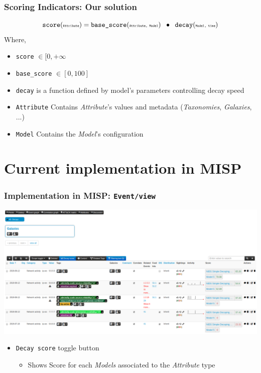 \begin{frame}
    \frametitle{Scoring Indicators: Our solution}
    $$ \texttt{score}(\texttt{\tiny Attribute}) = \texttt{base\_score}(\texttt{\tiny Attribute, Model}) \;\;\bullet\;\; \texttt{decay}(\texttt{\tiny Model, time}) $$
    Where,\vspace{0.5cm}
    \begin{itemize}
        \item \texttt{score} $ \in [0, +\infty $
        \item \texttt{base\_score} $ \in [0, 100] $
        \item \texttt{decay} is a function defined by model's parameters controlling decay speed
        \item \texttt{Attribute} Contains \textit{Attribute}'s values and metadata {\scriptsize (\textit{Taxonomies}, \textit{Galaxies}, ...)}
        \item \texttt{Model} Contains the \textit{Model}'s configuration
    \end{itemize}
    
\end{frame}

\section{Current implementation in MISP}
\begin{frame}
    \frametitle{Implementation in MISP: \texttt{Event/view}}
    \includegraphics[width=1.00\linewidth]{pics/decaying-event.png}
    \begin{itemize}
        \item \texttt{Decay score} toggle button
        \begin{itemize}
            \item Shows Score for each \textit{Models} associated to the \textit{Attribute} type
        \end{itemize}
    \end{itemize}
\end{frame}

